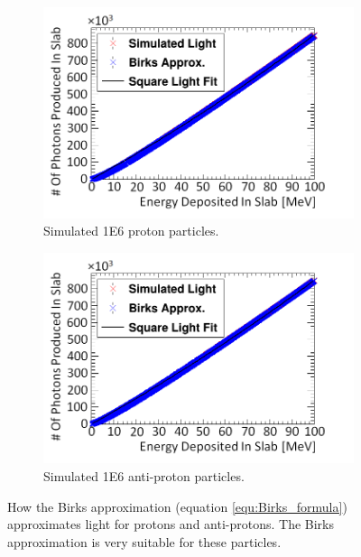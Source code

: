 \begin{figure}[htbp]
\centering
\begin{subfigure}{.5\textwidth}
  \centering
  \includegraphics[width=\linewidth]{Appendix5/newNewFigs/protonBirksSlab_simAndApproxLight.png}
  \captionsetup{width=.9\linewidth}
  \caption{Simulated 1E6 proton particles.}
  \label{subfig:append5_light_of_protons0-100mev}
\end{subfigure}%
\begin{subfigure}{.5\textwidth}
  \centering
  \includegraphics[width=\linewidth]{Appendix5/newNewFigs/aProtonBirksSlab_simAndApproxLight.png}
  \captionsetup{width=.9\linewidth}
  \caption{Simulated 1E6 anti-proton particles.}
  \label{subfig:append5_light_of_Aprotons0-100mev}
\end{subfigure}
\caption{How the Birks approximation (equation \ref{equ:Birks_formula}) approximates light for protons and anti-protons. The Birks approximation is very suitable for these particles.}
\label{fig:append5_light_of_protons_Aprotons0-100mev}
\end{figure}

